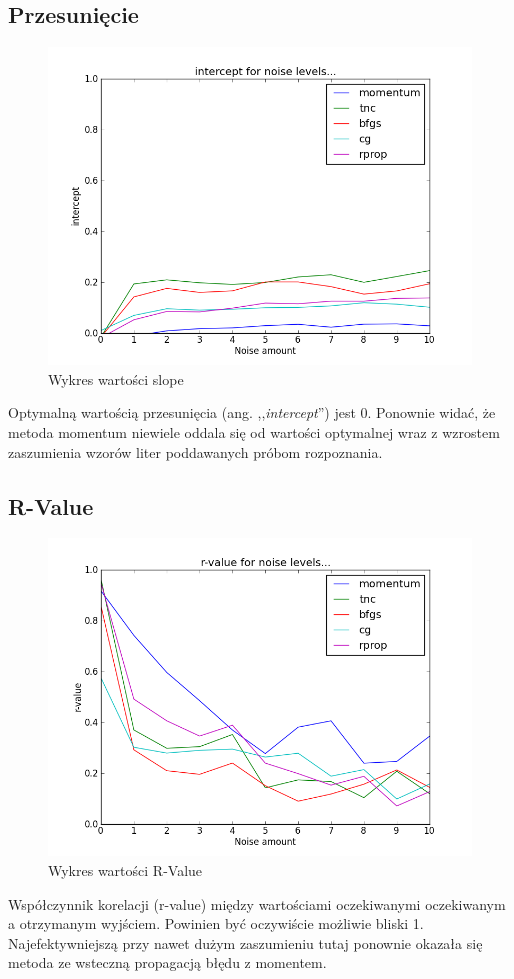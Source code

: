 \documentclass[a4paper]{article}
\begin{document}
\subsection{Przesunięcie}
\begin{figure}[pht]
 \centering
 \includegraphics[scale=0.5]{../compare_plots/compare_plot_intercept}
 \caption{Wykres wartości slope}\label{rys:plot1}
\end{figure}
Optymalną wartością przesunięcia (ang. ,,\textit{intercept}'') jest 0. Ponownie widać, że metoda momentum niewiele oddala się od
wartości optymalnej wraz z wzrostem zaszumienia wzorów liter poddawanych próbom rozpoznania.

\subsection{R-Value}
\begin{figure}[pht]
 \centering
 \includegraphics[scale=0.5]{../compare_plots/compare_plot_r_value}
 \caption{Wykres wartości R-Value}\label{rys:plot1}
\end{figure}
Współczynnik korelacji (r-value) między wartościami oczekiwanymi oczekiwanym a otrzymanym wyjściem.
Powinien być oczywiście możliwie bliski 1. 
Najefektywniejszą przy nawet dużym zaszumieniu tutaj ponownie okazała się metoda ze wsteczną propagacją błędu z momentem.
\end{document}
